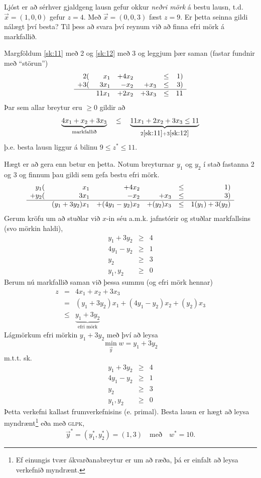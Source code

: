 \begin{lausn}
Ljóst er að sérhver gjaldgeng lausn gefur okkur \emph{neðri mörk} á bestu lausn, t.d. $\vec{x}=(1,0,0)$ gefur $z=4$. Með $\vec{x}=(0,0,3)$ fæst $z=9$. Er þetta seinna gildi nálægt því besta? Til þess að svara því reynum við að finna efri mörk á markfallið.

Margföldum \eqref{sk:11} með 2 og \eqref{sk:12} með 3 og leggjum þær saman (fastar fundnir með ``störun'')
\[\begin{array}{rrrrrrl}
  2(&x_1& +4x_2&& \leq & 1)\\
+ 3(&3x_1&-x_2&+x_3&\leq & 3)\\ \hline
 &  11x_1&+2x_2&+3x_3 &\leq &11
\end{array}\]
Þar sem allar breytur eru $\geq0$ gildir að
$$ \underbrace{4x_1+x_2+3x_3}_{\textrm{markfallið}} \quad \leq \quad \underbrace{11x_1+2x_2+3x_3 \leq 11}_{2\eqref{sk:11}+3\eqref{sk:12}}
$$
þ.e. besta lausn liggur á bilinu $9\leq z^*\leq 11$.

Hægt er að gera enn betur en þetta. Notum breyturnar $y_1$ og $y_2$ í stað fastanna 2 og 3 og finnum þau gildi sem gefa bestu efri mörk. 
\[\begin{array}{rrrrrrl}
  y_1(&x_1& +4x_2&& \leq & 1)\\
+ y_2(&3x_1&-x_2&+x_3&\leq & 3)\\ \hline
 &  (y_1+3y_2)x_1&+(4y_1-y_2)x_2&+(y_2)x_3 &\leq &1(y_1)+3(y_2)
\end{array}\]
Gerum kröfu  um að stuðlar við $x$-in séu a.m.k. jafnstórir og stuðlar markfallsins (svo mörkin haldi), 
\begin{eqnarray*}
 y_1+3y_2 &\geq& 4\\
 4y_1-y_2&\geq&1\\
y_2&\geq&3\\
y_1,y_2&\geq&0
\end{eqnarray*}
Berum nú markfallið saman við þessa summu (og efri mörk hennar)
\begin{eqnarray*}
 z&=&4x_1+x_2+3x_3\\&=&(y_1+3y_2)x_1+(4y_1-y_2)x_2+(y_2)x_3 \\ &\leq &\underbrace{y_1+3y_2}_{\textrm{efri mörk}}
\end{eqnarray*}
Lágmörkum efri mörkin $y_1+3y_2$ með því að leysa
$$ \min_{\vec{y}} w =y_1+3y_2 $$
m.t.t. sk. 
\begin{eqnarray*}
 y_1+3y_2 &\geq& 4\\
 4y_1-y_2&\geq&1\\
y_2&\geq&3\\
y_1,y_2&\geq&0
\end{eqnarray*}
Þetta verkefni kallast  frumverkefnisins (e. primal). Besta lausn er hægt að leysa myndrænt\footnote{Ef einungis tvær ákvarðanabreytur er um að ræða, þá er einfalt að leysa verkefnið myndrænt.} eða með \textsc{glpk}, 
$$ \vec{y}^*=(y_1^*,y_2^*)=(1,3)\quad\textrm{með}\quad w^*=10.$$
\end{lausn}

